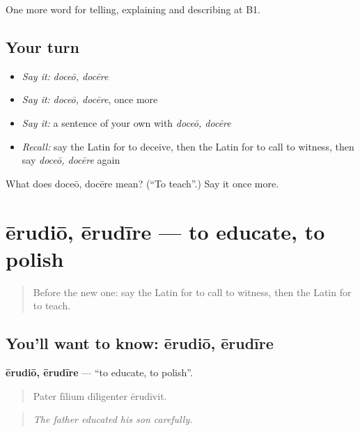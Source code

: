 \begin{grammarlens}[title={What you've built}]
One more word for telling, explaining and describing at B1.
\end{grammarlens}

\subsection*{Your turn}
\begin{itemize}
\raggedright
  \item \emph{Say it:} \emph{doceō, docēre}
  \item \emph{Say it:} \emph{doceō, docēre}, once more
  \item \emph{Say it:} a sentence of your own with \emph{doceō, docēre}
  \item \emph{Recall:} say the Latin for to deceive, then the Latin for to call to witness, then say \emph{doceō, docēre} again
\end{itemize}

\begin{tcolorbox}[breakable,colback=teal!4,colframe=teal!35!black,title={Before you move on}]
What does doceō, docēre mean? (\textquotedblleft{}To teach\textquotedblright{}.) Say it once more.
\end{tcolorbox}
\section[ērudiō, ērudīre]{ērudiō, ērudīre — to educate, to polish}

\label{lesson:LA-C400-erudio}



\begin{quote}
Before the new one: say the Latin for to call to witness, then the Latin for to teach.
\end{quote}

\subsection*{You'll want to know: ērudiō, ērudīre}
\textbf{ērudiō, ērudīre} — \textquotedblleft{}to educate, to polish\textquotedblright{}.

\begin{quote}
Pater fīlium dīligenter ērudīvit.
\end{quote}

\begin{quote}
\emph{The father educated his son carefully.}
\end{quote}

